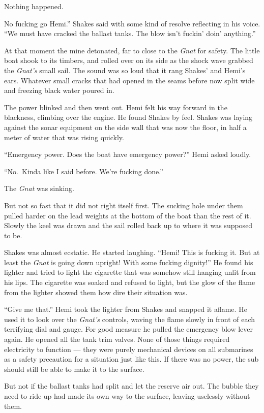 \documentclass[
]{scrbook}
\begin{document}
Nothing happened.

No fucking go Hemi.'' Shakes said with some kind of resolve reflecting
in his voice. ``We must have cracked the ballast tanks. The blow isn't
fuckin' doin' anything.''

At that moment the mine detonated, far to close to the \emph{Gnat} for
safety. The little boat shook to its timbers, and rolled over on its
side as the shock wave grabbed the \emph{Gnat's} small sail. The sound
was so loud that it rang Shakes' and Hemi's ears. Whatever small cracks
that had opened in the seams before now split wide and freezing black
water poured in.

The power blinked and then went out. Hemi felt his way forward in the
blackness, climbing over the engine. He found Shakes by feel. Shakes was
laying against the sonar equipment on the side wall that was now the
floor, in half a meter of water that was rising quickly.

``Emergency power. Does the boat have emergency power?'' Hemi asked
loudly.

``No.~Kinda like I said before. We're fucking done.''

The \emph{Gnat} was sinking.

But not so fast that it did not right itself first. The sucking hole
under them pulled harder on the lead weights at the bottom of the boat
than the rest of it. Slowly the keel was drawn and the sail rolled back
up to where it was supposed to be.

Shakes was almost ecstatic. He started laughing. ``Hemi! This is fucking
it. But at least the \emph{Gnat} is going down upright! With some
fucking dignity!'' He found his lighter and tried to light the cigarette
that was somehow still hanging unlit from his lips. The cigarette was
soaked and refused to light, but the glow of the flame from the lighter
showed them how dire their situation was.

``Give me that.'' Hemi took the lighter from Shakes and snapped it
aflame. He used it to look over the \emph{Gnat's} controls, waving the
flame slowly in front of each terrifying dial and gauge. For good
measure he pulled the emergency blow lever again. He opened all the tank
trim valves. None of those things required electricity to function ---
they were purely mechanical devices on all submarines as a safety
precaution for a situation just like this. If there was no power, the
sub should still be able to make it to the surface.

But not if the ballast tanks had split and let the reserve air out. The
bubble they need to ride up had made its own way to the surface, leaving
uselessly without them.
\end{document}
